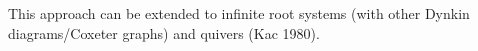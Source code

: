 This approach can be extended to infinite root systems
(with other Dynkin diagrams/Coxeter graphs) and quivers (Kac 1980).
